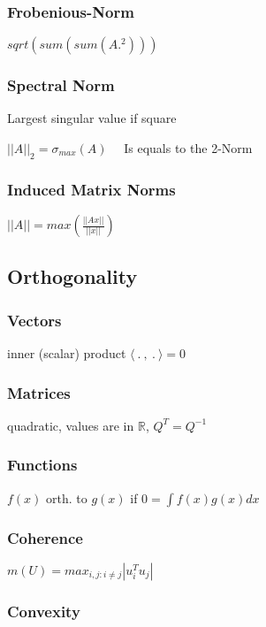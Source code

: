 \documentclass[11pt,twocolumn]{article}
\begin{document}
\subsubsection{Frobenious-Norm}
$sqrt(sum(sum(A.^2)))$

\subsubsection{Spectral Norm} 
Largest singular value if square 

$||A||_2 = \sigma_{max}(A)$ 
~~Is equals to the 2-Norm

\subsubsection{Induced Matrix Norms}
$ ||A|| = max \left( \frac{ ||Ax|| }{ ||x|| } \right)$

\subsection{Orthogonality}

\subsubsection{Vectors} 

inner (scalar) product $\langle ~.~,~.~ \rangle = 0$

\subsubsection{Matrices} 

quadratic, values are in $\mathbb{R}$, $Q^T = Q^{-1}$

\subsubsection{Functions}

$f(x)$ orth. to $g(x)$ if $0 = \int f(x) g(x) dx $

\subsubsection{Coherence}

$m(U)= max_{i,j:i\neq j} | u_i^T u_j|$

\subsubsection{Convexity}
\end{document}
